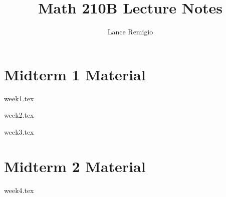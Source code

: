 \documentclass[a4paper]{article}
\title{Math 210B Lecture Notes}
\author{Lance Remigio}
\begin{document}
\maketitle

\section{Midterm 1 Material} 

{week1.tex}

{week2.tex}

{week3.tex}

\section{Midterm 2 Material}

{week4.tex}
\end{document}
